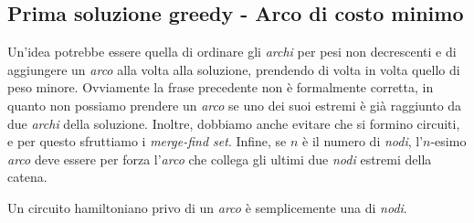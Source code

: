\subsection{Prima soluzione greedy - Arco di costo minimo}
Un'idea potrebbe essere quella di ordinare gli \emph{archi} per pesi non
decrescenti e di aggiungere un \emph{arco} alla volta alla soluzione, prendendo
di volta in volta quello di peso minore. Ovviamente la frase precedente non è
formalmente corretta, in quanto non possiamo prendere un \emph{arco} se uno dei
suoi estremi è già raggiunto da due \emph{archi} della soluzione. Inoltre,
dobbiamo anche evitare che si formino circuiti, e per questo sfruttiamo i
\emph{merge-find set}. Infine, se $n$ è il numero di \emph{nodi}, l'$n$-esimo
\emph{arco} deve essere per forza l'\emph{arco} che collega gli ultimi due
\emph{nodi} estremi della catena.
\begin{note}
    Un circuito hamiltoniano privo di un \emph{arco} è semplicemente una
     di \emph{nodi}.
\end{note}

